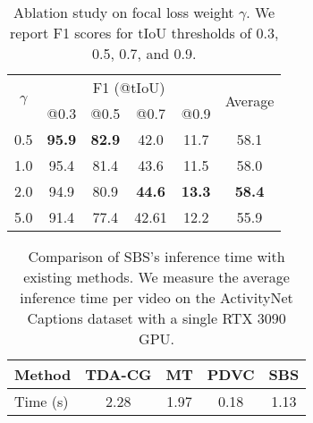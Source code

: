 \begin{table}[t]
  \parbox{\linewidth}{
    \centering
    \caption{
      Ablation study on focal loss weight $\gamma$.
      We report F1 scores for tIoU thresholds of 0.3, 0.5, 0.7, and 0.9.
    }
    \setlength\tabcolsep{6pt}
    \begin{tabular}{c|cccc|c}
      \hline
      \multirow{2}{*}{$\gamma$} & \multicolumn{4}{c|}{F1 (@tIoU)} & \multirow{2}{*}{Average}                                                 \\
                                & @0.3                            & @0.5                     & @0.7          & @0.9          &               \\
      \hline
      0.5                       & \textbf{95.9}                   & \textbf{82.9}            & 42.0          & 11.7          & 58.1          \\
      1.0                       & 95.4                            & 81.4                     & 43.6          & 11.5          & 58.0          \\
      2.0                       & 94.9                            & 80.9                     & \textbf{44.6} & \textbf{13.3} & \textbf{58.4} \\
      5.0                       & 91.4                            & 77.4                     & 42.61         & 12.2          & 55.9          \\
      \hline
    \end{tabular}
    \label{tab:exp_ablation_gamma}
  }
\end{table}

\begin{table}[t]
  \centering
  \caption{
    {Comparison of SBS's inference time with existing methods.
        We measure the average inference time per video on the ActivityNet Captions dataset with a single RTX 3090 GPU.}
  }
  \begin{tabular}{l|cccc}
    \hline
    {Method}   & {TDA-CG \cite{wang2018bidirectional}} & {MT \cite{zhou2018end}} & {PDVC \cite{wang2021end}} & {{SBS}}  \\
    \hline
    {Time (s)} & {2.28}                                & {1.97}                  & {0.18}                    & {{1.13}} \\
    \hline
  \end{tabular}
  \label{tab:eval_inference_time}
\end{table}

